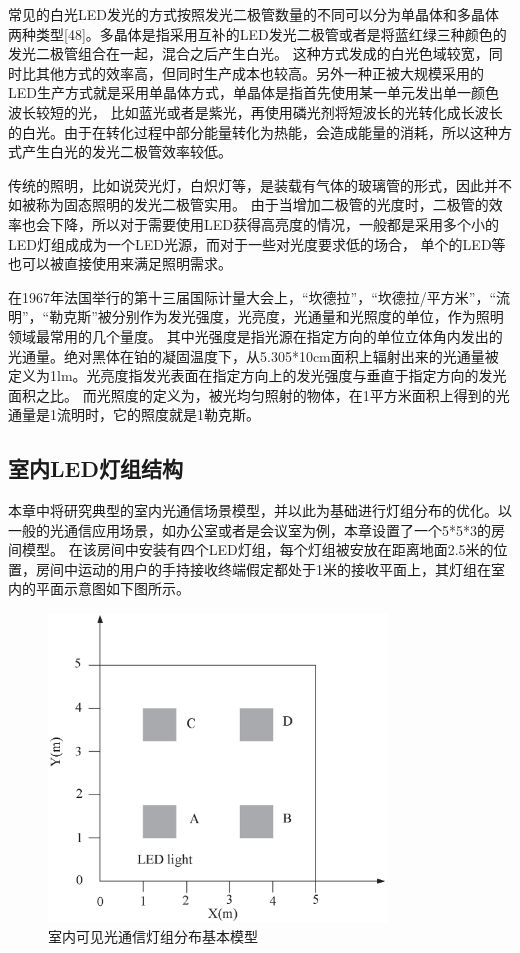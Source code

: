 常见的白光LED发光的方式按照发光二极管数量的不同可以分为单晶体和多晶体两种类型[48]。多晶体是指采用互补的LED发光二极管或者是将蓝红绿三种颜色的发光二极管组合在一起，混合之后产生白光。
这种方式发成的白光色域较宽，同时比其他方式的效率高，但同时生产成本也较高。另外一种正被大规模采用的LED生产方式就是采用单晶体方式，单晶体是指首先使用某一单元发出单一颜色波长较短的光，
比如蓝光或者是紫光，再使用磷光剂将短波长的光转化成长波长的白光。由于在转化过程中部分能量转化为热能，会造成能量的消耗，所以这种方式产生白光的发光二极管效率较低。

传统的照明，比如说荧光灯，白炽灯等，是装载有气体的玻璃管的形式，因此并不如被称为固态照明的发光二极管实用。
由于当增加二极管的光度时，二极管的效率也会下降，所以对于需要使用LED获得高亮度的情况，一般都是采用多个小的LED灯组成成为一个LED光源，而对于一些对光度要求低的场合，
单个的LED等也可以被直接使用来满足照明需求。

在1967年法国举行的第十三届国际计量大会上，``坎德拉''，``坎德拉/平方米''，``流明''，``勒克斯''被分别作为发光强度，光亮度，光通量和光照度的单位，作为照明领域最常用的几个量度。
其中光强度是指光源在指定方向的单位立体角内发出的光通量。绝对黑体在铂的凝固温度下，从5.305*10cm面积上辐射出来的光通量被定义为1lm。光亮度指发光表面在指定方向上的发光强度与垂直于指定方向的发光面积之比。
而光照度的定义为，被光均匀照射的物体，在1平方米面积上得到的光通量是1流明时，它的照度就是1勒克斯。

\subsection{室内LED灯组结构}
本章中将研究典型的室内光通信场景模型，并以此为基础进行灯组分布的优化。以一般的光通信应用场景，如办公室或者是会议室为例，本章设置了一个5*5*3的房间模型。
在该房间中安装有四个LED灯组，每个灯组被安放在距离地面2.5米的位置，房间中运动的用户的手持接收终端假定都处于1米的接收平面上，其灯组在室内的平面示意图如下图所示。

\begin{figure}[htbp]
    \centering
	\includegraphics[width=0.8\textwidth]{figures/chapter-3/LedLayout.eps}
	\caption{室内可见光通信灯组分布基本模型}
	\label{fig:led-layout-pic}
\end{figure}

